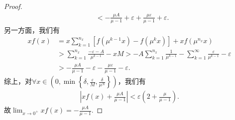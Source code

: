 \documentclass[../../main.tex]{subfiles}%
\begin{document}
\begin{proof}
\begin{align*}
&< -\frac{\mu A}{\mu - 1} + \varepsilon + \frac{\mu \varepsilon}{\mu - 1} + \varepsilon.
\end{align*}
另一方面，我们有
\begin{align*}
xf\left( x \right) &= x\sum_{k=1}^{n_x} \left[ f\left( \mu^{k-1}x \right) - f\left( \mu^k x \right) \right] + xf\left( \mu^{n_x} x \right) \\
&> \sum_{k=1}^{n_x} \frac{-\varepsilon - A}{\mu^{k-1}} - xM > -A\sum_{k=1}^{n_x} \frac{1}{\mu^{k-1}} - \sum_{k=1}^{\infty} \frac{\varepsilon}{\mu^{k-1}} - \varepsilon \\
&> -\frac{\mu A}{\mu - 1} - \varepsilon - \frac{\mu \varepsilon}{\mu - 1} - \varepsilon.
\end{align*}
综上，对$\forall x \in \left( 0,\min \left\{ \delta, \frac{\varepsilon}{M}, \frac{\delta}{\mu^N} \right\} \right)$，我们有
\begin{align*}
\left| xf\left( x \right) + \frac{\mu A}{\mu - 1} \right| < \varepsilon \left( 2 + \frac{\mu}{\mu - 1} \right).
\end{align*}
故$\lim_{x \to 0^+} xf\left( x \right) = -\frac{\mu A}{\mu - 1}.$\end{proof}
\end{document}
